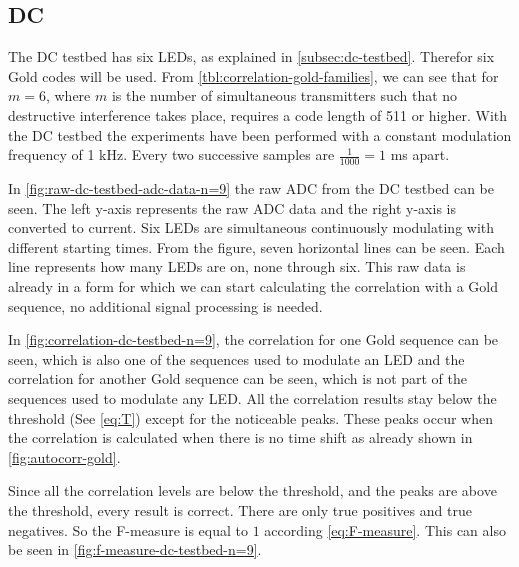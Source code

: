 
\subsection{DC}
\label{subsec:dc-testbed-eval}

The DC testbed has six LEDs, as explained in \autoref{subsec:dc-testbed}.
Therefor six Gold codes will be used.
From \autoref{tbl:correlation-gold-families}, we can see that for $m = 6$, where $m$ is the number of simultaneous transmitters such that no destructive interference takes place, requires a code length of 511 or higher.
With the DC testbed the experiments have been performed with a constant modulation frequency of 1 kHz.
Every two successive samples are $\frac{1}{1000} = 1$ ms apart.

In \autoref{fig:raw-dc-testbed-adc-data-n=9} the raw ADC from the DC testbed can be seen.
The left y-axis represents the raw ADC data and the right y-axis is converted to current.
Six LEDs are simultaneous continuously modulating with different starting times.
From the figure, seven horizontal lines can be seen.
Each line represents how many LEDs are on, none through six.
This raw data is already in a form for which we can start calculating the correlation with a Gold sequence, no additional signal processing is needed.

In \autoref{fig:correlation-dc-testbed-n=9}, the correlation for one Gold sequence can be seen, which is also one of the sequences used to modulate an LED and the correlation for another Gold sequence can be seen, which is not part of the sequences used to modulate any LED.
All the correlation results stay below the threshold (See \autoref{eq:T}) except for the noticeable peaks.
These peaks occur when the correlation is calculated when there is no time shift as already shown in \autoref{fig:autocorr-gold}.

Since all the correlation levels are below the threshold, and the peaks are above the threshold, every result is correct.
There are only true positives and true negatives.
So the F-measure is equal to $1$ according \autoref{eq:F-measure}.
This can also be seen in \autoref{fig:f-measure-dc-testbed-n=9}.


